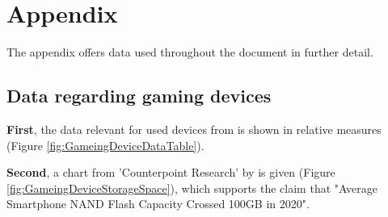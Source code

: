 
\chapter{Appendix}
\label{chap:Appendix}
The appendix offers data used throughout the document in further detail.



\section{Data regarding gaming devices}

\textbf{First}, the data relevant for used devices from \cite[7]{LimelightNetworks.2020} is shown in relative measures (Figure \ref{fig:GameingDeviceDataTable}).
\begin{figure}
\end{figure}

\noindent \textbf{Second}, a chart from 'Counterpoint Research' by \cite{Wang.2021} is given (Figure \ref{fig:GameingDeviceStorageSpace}),
which supports the claim that "Average Smartphone NAND Flash Capacity Crossed 100GB in 2020".

\begin{figure}
\end{figure}

